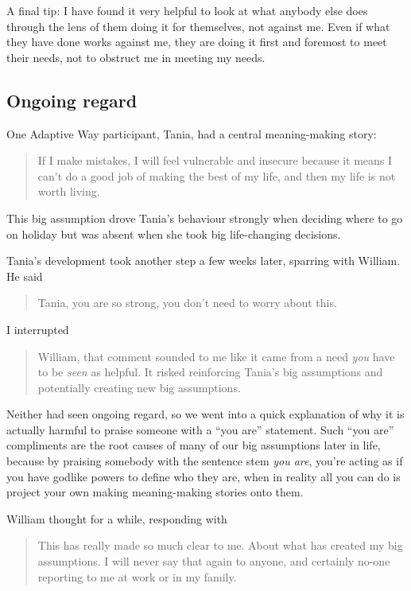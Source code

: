 A final tip: I have found it very helpful to look at what anybody else does through the lens of them doing it for themselves, not against me. Even if what they have done works against me, they are doing it first and foremost to meet their needs, not to obstruct me in meeting my needs. 
\subsection{Ongoing regard}
\label{section:ongoing-regard}
One Adaptive Way  participant, Tania, had a central meaning\hyp{}making story: \begin{quote}If I make mistakes, I will feel vulnerable and insecure because it means I can't do a good job of making the best of my life, and then my life is not worth living.\end{quote} This big assumption drove Tania's behaviour strongly when deciding where to go on holiday but was absent when she took big life-changing decisions.


\begin{longstoryblock}
Tania's development took another step a few weeks later, sparring with William. He said \begin{quote}Tania, you are so strong, you don't need to worry about this.\end{quote} 


I interrupted \begin{quote}William, that comment sounded to me like it came from a need \emph{you} have to be \emph{seen} as helpful. It risked reinforcing Tania's big assumptions and potentially creating new big assumptions.\end{quote}


Neither had seen ongoing regard, so we went into a quick explanation of why it is actually harmful to praise someone with a “you are” statement. Such “you are” compliments are the root causes of many of our big assumptions later in life, because by praising somebody with the sentence stem \emph{you are}, you’re acting as if you have godlike powers to define who they are, when in reality all you can do is project your own making meaning\hyp{}making stories onto them.


William thought for a while, responding with \begin{quote}This has really made so much clear to me. About what has created my big assumptions. I will never say that again to anyone, and certainly no-one reporting to me at work or in my family. \end{quote}
\end{longstoryblock}


